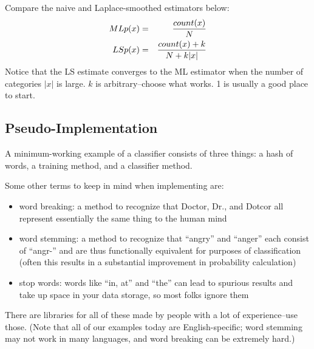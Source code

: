 \documentclass[12pt,letter]{article}
\begin{document}
Compare the naive and Laplace-smoothed estimators below:
\begin{eqnarray*}
ML p(x) &=& {count(x) \over N} \\
LS p(x) &=& {count(x) + k \over N + k|x|}
\end{eqnarray*}
Notice that the LS estimate converges to the ML estimator when the
number of categories $|x|$ is large. $k$ is arbitrary--choose what
works. 1 is usually a good place to start.


\subsection{Pseudo-Implementation}

A minimum-working example of a classifier consists of three things: a
hash of words, a training method, and a classifier method.

Some other terms to keep in mind when implementing are:
\begin{itemize}
\item word breaking: a method to recognize that Doctor, Dr., and Dotcor all
represent essentially the same thing to the human mind
\item word stemming: a method to recognize that ``angry'' and
  ``anger'' each consist of ``angr-'' and are thus functionally
  equivalent for purposes of classification (often this results in a
  substantial improvement in probability calculation)
\item stop words: words like ``in, at'' and ``the'' can lead to
  spurious results and take up space in your data storage, so most
  folks ignore them
\end{itemize}

There are libraries for all of these made by people with a lot of
experience--use those. (Note that all of our examples today are
English-specific; word stemming may not work in many languages, and
word breaking can be extremely hard.) 



\pagebreak
\onehalfspacing



\pagebreak
\end{document}
